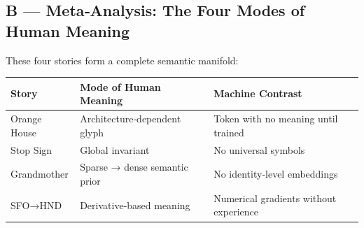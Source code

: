 \hypertarget{b-metaanalysis-the-four-modes-of-human-meaning}{%
\subsection{B --- Meta‑Analysis: The Four Modes of Human
Meaning}\label{b-metaanalysis-the-four-modes-of-human-meaning}}

These four stories form a complete semantic manifold:

\begin{longtable}[]{@{}lll@{}}
\toprule
\begin{minipage}[b]{0.15\columnwidth}\raggedright
Story\strut
\end{minipage} & \begin{minipage}[b]{0.33\columnwidth}\raggedright
Mode of Human Meaning\strut
\end{minipage} & \begin{minipage}[b]{0.43\columnwidth}\raggedright
Machine Contrast\strut
\end{minipage}\tabularnewline
\midrule
\endhead
\begin{minipage}[t]{0.15\columnwidth}\raggedright
Orange House\strut
\end{minipage} & \begin{minipage}[t]{0.33\columnwidth}\raggedright
Architecture‑dependent glyph\strut
\end{minipage} & \begin{minipage}[t]{0.43\columnwidth}\raggedright
Token with no meaning until trained\strut
\end{minipage}\tabularnewline
\begin{minipage}[t]{0.15\columnwidth}\raggedright
Stop Sign\strut
\end{minipage} & \begin{minipage}[t]{0.33\columnwidth}\raggedright
Global invariant\strut
\end{minipage} & \begin{minipage}[t]{0.43\columnwidth}\raggedright
No universal symbols\strut
\end{minipage}\tabularnewline
\begin{minipage}[t]{0.15\columnwidth}\raggedright
Grandmother\strut
\end{minipage} & \begin{minipage}[t]{0.33\columnwidth}\raggedright
Sparse → dense semantic prior\strut
\end{minipage} & \begin{minipage}[t]{0.43\columnwidth}\raggedright
No identity‑level embeddings\strut
\end{minipage}\tabularnewline
\begin{minipage}[t]{0.15\columnwidth}\raggedright
SFO→HND\strut
\end{minipage} & \begin{minipage}[t]{0.33\columnwidth}\raggedright
Derivative‑based meaning\strut
\end{minipage} & \begin{minipage}[t]{0.43\columnwidth}\raggedright
Numerical gradients without experience\strut
\end{minipage}\tabularnewline
\bottomrule
\end{longtable}

